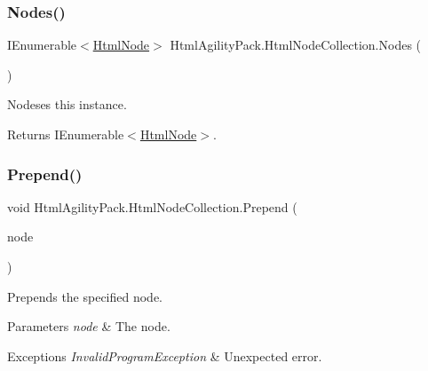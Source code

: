 \subsubsection{\texorpdfstring{Nodes()}{Nodes()}}
{\footnotesize\ttfamily I\+Enumerable$<$\hyperlink{class_html_agility_pack_1_1_html_node}{Html\+Node}$>$ Html\+Agility\+Pack.\+Html\+Node\+Collection.\+Nodes (\begin{DoxyParamCaption}{ }\end{DoxyParamCaption})\hspace{0.3cm}{\ttfamily [inline]}}



Nodeses this instance. 

\begin{DoxyReturn}{Returns}
I\+Enumerable$<$\hyperlink{class_html_agility_pack_1_1_html_node}{Html\+Node}$>$.
\end{DoxyReturn}
\mbox{\label{class_html_agility_pack_1_1_html_node_collection_a78673ebcce85f224de5cd11f807ed319}} 
\subsubsection{\texorpdfstring{Prepend()}{Prepend()}}
{\footnotesize\ttfamily void Html\+Agility\+Pack.\+Html\+Node\+Collection.\+Prepend (\begin{DoxyParamCaption}\item[{\hyperlink{class_html_agility_pack_1_1_html_node}{Html\+Node}}]{node }\end{DoxyParamCaption})\hspace{0.3cm}{\ttfamily [inline]}}



Prepends the specified node. 


\begin{DoxyParams}{Parameters}
{\em node} & The node.\\
\hline
\end{DoxyParams}

\begin{DoxyExceptions}{Exceptions}
{\em Invalid\+Program\+Exception} & Unexpected error.\\
\hline
\end{DoxyExceptions}
\mbox{\label{class_html_agility_pack_1_1_html_node_collection_a4c67bb2596e9bfe3bb1b43fd3e28236f}} 
